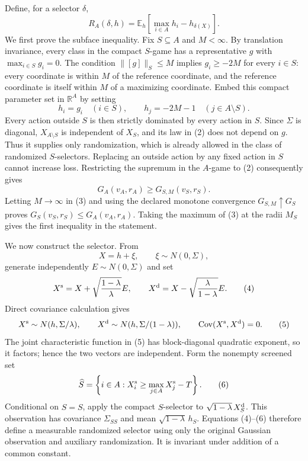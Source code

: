 Define, for a selector \(\delta\),
\[
R_A(\delta,h)=\mathbb E_h\!\left[\max_{i\in A}h_i-h_{\delta(X)}\right]. \tag{1}
\]
We first prove the subface inequality.  Fix \(S\subseteq A\) and \(M<\infty\).  By translation invariance, every class in the compact \(S\)-game has a representative \(g\) with \(\max_{i\in S}g_i=0\).  The condition \(\lVert[g]\rVert_S\leq M\) implies \(g_i\geq-2M\) for every \(i\in S\): every coordinate is within \(M\) of the reference coordinate, and the reference coordinate is itself within \(M\) of a maximizing coordinate.  Embed this compact parameter set in \(\mathbb R^A\) by setting
\[
h_i=g_i\quad(i\in S),
\qquad h_j=-2M-1\quad(j\in A\setminus S). \tag{2}
\]
Every action outside \(S\) is then strictly dominated by every action in \(S\).  Since \(\Sigma\) is diagonal, \(X_{A\setminus S}\) is independent of \(X_S\), and its law in (2) does not depend on \(g\).  Thus it supplies only randomization, which is already allowed in the class of randomized \(S\)-selectors.  Replacing an outside action by any fixed action in \(S\) cannot increase loss.  Restricting the supremum in the \(A\)-game to (2) consequently gives
\[
G_A(v_A,r_A)\geq G_{S,M}(v_S,r_S). \tag{3}
\]
Letting \(M\to\infty\) in (3) and using the declared monotone convergence \(G_{S,M}\uparrow G_S\) proves \(G_S(v_S,r_S)\leq G_A(v_A,r_A)\).  Taking the maximum of (3) at the radii \(M_S\) gives the first inequality in the statement.

We now construct the selector.  From
\[
X=h+\xi,\qquad \xi\sim N(0,\Sigma),
\]
generate independently \(E\sim N(0,\Sigma)\) and set
\[
X^{\rm s}=X+\sqrt{\frac{1-\lambda}{\lambda}}E,
\qquad
X^{\rm d}=X-\sqrt{\frac{\lambda}{1-\lambda}}E. \tag{4}
\]
Direct covariance calculation gives
\[
X^{\rm s}\sim N(h,\Sigma/\lambda),\qquad
X^{\rm d}\sim N(h,\Sigma/(1-\lambda)),\qquad
\operatorname{Cov}(X^{\rm s},X^{\rm d})=0. \tag{5}
\]
The joint characteristic function in (5) has block-diagonal quadratic exponent, so it factors; hence the two vectors are independent.  Form the nonempty screened set
\[
\widehat S=\left\{i\in A:X_i^{\rm s}\geq\max_{j\in A}X_j^{\rm s}-T\right\}. \tag{6}
\]
Conditional on \(\widehat S=S\), apply the compact \(S\)-selector to \(\sqrt{1-\lambda}\,X_S^{\rm d}\).  This observation has covariance \(\Sigma_{SS}\) and mean \(\sqrt{1-\lambda}\,h_S\).  Equations (4)--(6) therefore define a measurable randomized selector using only the original Gaussian observation and auxiliary randomization.  It is invariant under addition of a common constant.

